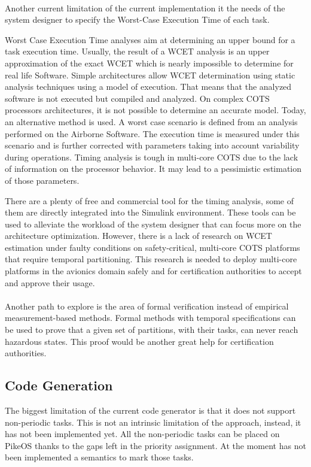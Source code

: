 \paragraph{} Another current limitation of the current implementation it the needs of the system designer to specify the Worst-Case Execution Time of each task. 
\par Worst Case Execution Time analyses aim at determining an upper bound for a task execution time. Usually, the result of a WCET analysis is an upper approximation of the exact WCET which is nearly impossible to determine for real life Software. Simple architectures allow WCET determination using static analysis techniques using a model of execution. That means that the analyzed software is not executed but compiled and analyzed. On complex COTS processors architectures, it is not possible to determine an accurate model. Today, an alternative method is used. A worst case scenario is defined from an analysis performed on the Airborne Software. The execution time is measured under this scenario and is further corrected with parameters taking into account variability during operations. Timing analysis is tough in multi-core COTS due to the lack of information on the processor behavior. It may lead to a pessimistic estimation of those parameters. 
\par There are a plenty of free and commercial tool for the timing analysis, some of them are directly integrated into the Simulink environment. These tools can be used to alleviate the workload of the system designer that can focus more on the architecture optimization. 
However, there is a lack of research on WCET estimation under faulty conditions on safety-critical, multi-core COTS platforms that require temporal partitioning. This research is needed to deploy multi-core platforms in the avionics domain safely and for certification authorities to accept and approve their usage.

\paragraph{} Another path to explore is the area of formal verification instead of empirical measurement-based methods. Formal methods with temporal specifications can be used to prove that a given set of partitions, with their tasks, can never reach hazardous states. This proof would be another great help for certification authorities.

\subsection{Code Generation}
The biggest limitation of the current code generator is that it does not support non-periodic tasks. This is not an intrinsic limitation of the approach, instead, it has not been implemented yet. All the non-periodic tasks can be placed on PikeOS  thanks to the gaps left in the priority assignment. At the moment has not been implemented a semantics to mark those tasks.

